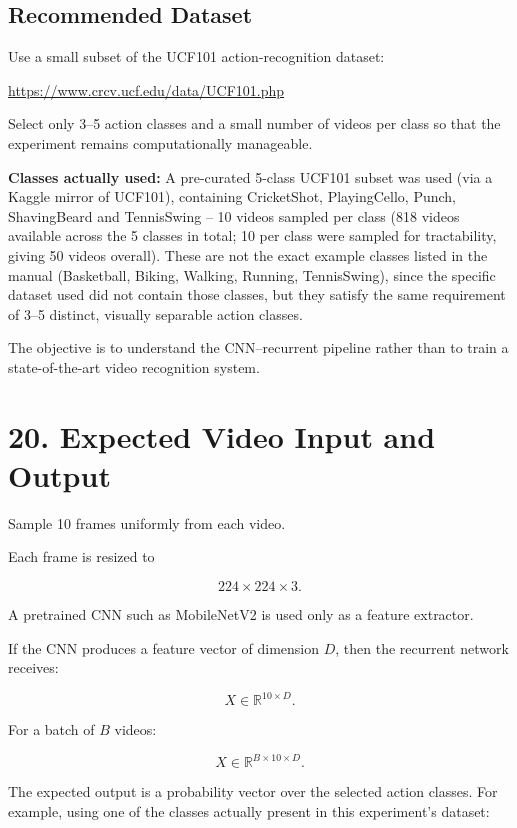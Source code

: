 \documentclass[10pt]{article}
\begin{document}
\subsection*{Recommended Dataset}

Use a small subset of the UCF101 action-recognition dataset:

\url{https://www.crcv.ucf.edu/data/UCF101.php}

Select only 3--5 action classes and a small number of videos per class so that
the experiment remains computationally manageable.

\textbf{Classes actually used:} A pre-curated 5-class UCF101 subset was
used (via a Kaggle mirror of UCF101), containing CricketShot, PlayingCello,
Punch, ShavingBeard and TennisSwing -- 10 videos sampled per class (818
videos available across the 5 classes in total; 10 per class were sampled
for tractability, giving 50 videos overall). These are not the exact
example classes listed in the manual (Basketball, Biking, Walking, Running,
TennisSwing), since the specific dataset used did not contain those classes,
but they satisfy the same requirement of 3--5 distinct, visually separable
action classes.

The objective is to understand the CNN--recurrent pipeline rather than to
train a state-of-the-art video recognition system.

\section*{20. Expected Video Input and Output}

Sample 10 frames uniformly from each video.

Each frame is resized to

\[
224\times224\times3.
\]

A pretrained CNN such as MobileNetV2 is used only as a feature extractor.

If the CNN produces a feature vector of dimension $D$, then the recurrent
network receives:

\[
X\in\mathbb{R}^{10\times D}.
\]

For a batch of $B$ videos:

\[
X\in\mathbb{R}^{B\times10\times D}.
\]

The expected output is a probability vector over the selected action classes.
For example, using one of the classes actually present in this experiment's
dataset:
\end{document}
